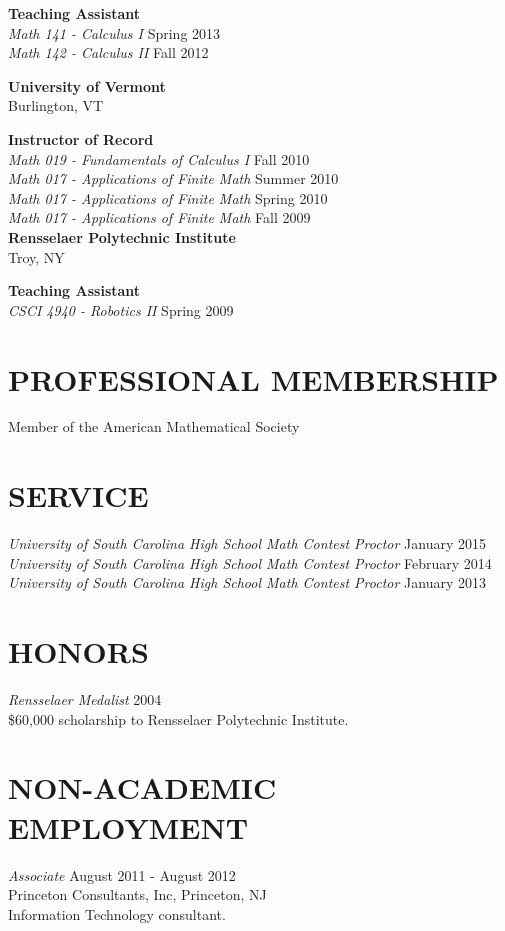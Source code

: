 \documentclass[line,overlapped]{res}
\begin{document}
\begin{resume}
  \textbf{Teaching Assistant}\\
  \textsl{Math 141 - Calculus I} \hfill Spring 2013\\
  \textsl{Math 142 - Calculus II} \hfill Fall 2012

  \textbf{University of Vermont}\\Burlington, VT
  
  \textbf{Instructor of Record}\\
  \textsl{Math 019 - Fundamentals of Calculus I} \hfill Fall 2010\\
  \textsl{Math 017 - Applications of Finite Math} \hfill Summer 2010\\
  \textsl{Math 017 - Applications of Finite Math} \hfill Spring 2010\\
  \textsl{Math 017 - Applications of Finite Math} \hfill Fall 2009\\
  
  \textbf{Rensselaer Polytechnic Institute}\\Troy, NY

  \textbf{Teaching Assistant}\\
  \textsl{CSCI 4940 - Robotics II} \hfill Spring 2009\\
  \section{PROFESSIONAL MEMBERSHIP}
  Member of the American Mathematical Society
  \section{SERVICE}
  \textsl{University of South Carolina High School Math Contest Proctor} \hfill January 2015\\
  \textsl{University of South Carolina High School Math Contest Proctor} \hfill February 2014\\
  \textsl{University of South Carolina High School Math Contest Proctor} \hfill January 2013

  \section{HONORS}
  \textsl{Rensselaer Medalist} \hfill 2004\\
  \$60,000 scholarship to Rensselaer Polytechnic Institute.

  \newpage

  \section{NON-ACADEMIC\\EMPLOYMENT}             
  \textsl{Associate} \hfill August 2011 - August 2012\\
  Princeton Consultants, Inc, Princeton, NJ\\
  Information Technology consultant.


\end{resume}
\end{document}
